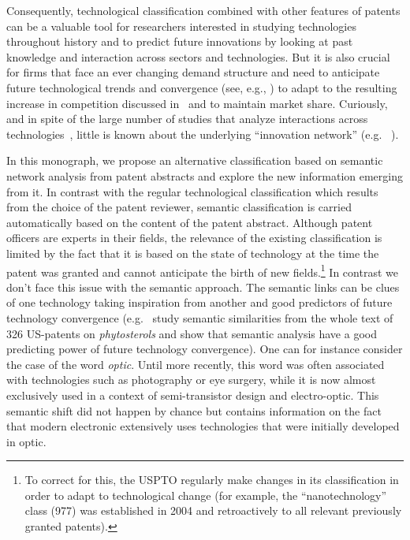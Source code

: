 \documentclass[10pt,A4,draft]{article}
\begin{document}
Consequently, technological classification combined with other features of patents can be a valuable tool for researchers interested in studying technologies throughout history and to predict future innovations by looking at past knowledge and interaction across sectors and technologies. But it is also crucial for firms that face an ever changing demand structure and need to anticipate future technological trends and convergence (see, e.g., \cite{curran2011patent}) to adapt to the resulting increase in competition discussed in~\cite{Katz1996remarks} and to maintain market share. Curiously, and in spite of the large number of studies that analyze interactions across technologies~\cite{Furman2011shoulders}, little is known about the underlying ``innovation network'' (e.g. ~\cite{AAKnetwork2016}). 

In this monograph, we propose an alternative classification based on semantic network analysis from patent abstracts and explore the new information emerging from it. In contrast with the regular technological classification which results from the choice of the patent reviewer, semantic classification is carried automatically based on the content of the patent abstract. Although patent officers are experts in their fields, the relevance of the existing classification is limited by the fact that it is based on the state of technology at the time the patent was granted and cannot anticipate the birth of new fields.\footnote{To correct for this, the USPTO regularly make changes in its classification in order to adapt to technological change (for example, the ``nanotechnology'' class (977) was established in 2004 and  retroactively to all relevant previously granted patents).} In contrast we don't face this issue with the semantic approach. The semantic links can be clues of one technology taking inspiration from another and  good predictors of future technology convergence (e.g.~\cite{preschitschek2013} study semantic similarities from the whole text of 326 US-patents on \textit{phytosterols} and show that semantic analysis have a good predicting power of future technology convergence). One can for instance consider the case of the word \textit{optic}. Until more recently, this word was often associated with technologies such as photography or eye surgery, while it is now almost exclusively used in a context of semi-transistor design and electro-optic. This semantic shift did not happen by chance but contains information on the fact that modern electronic extensively uses technologies that were initially developed in optic. 
\end{document}
